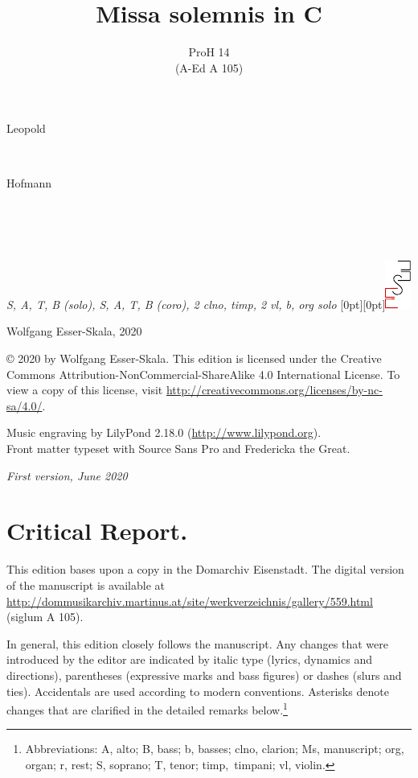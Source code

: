 \documentclass[parskip=full]{scrreprt}
\makeatletter
\DeclareRobustCommand{\sbseries}{\fontseries{sb}\selectfont}
\newcommand\fancytitlehead{
	\headingfont%
	\fontsize{80}{80}\selectfont\textcolor{black!80}{\@ifundefined{@shortname}{\@lastname}{\@shortname}.}\\[15pt]%
	\fontsize{60}{60}\selectfont\@ifundefined{@shorttitle}{\@title}{\@shorttitle}.%
}
\def\firstname#1{\def\@firstname{#1}}
\def\lastname#1{\def\@lastname{#1}}
\def\shorttitle#1{\def\@shorttitle{#1}}
\def\instrumentation#1{\def\@instrumentation{#1}}
\def\maketitle{%
\begin{titlepage}%
	\Large%
	{\@titlehead}%
	\vfill%
	{\strut\@firstname}\\%
	{\sbseries\color{oldred}\strut\@lastname}\\%
	{\strut\@namesuffix}%
	\vfill%
	{\sbseries\@title}\\%
	{\@subtitle}\\[\baselineskip]%
	{\itshape\@instrumentation}%
	\vfill%
	{\itshape\@parts}\hspace*{\fill}\raisebox{0pt}[0pt][0pt]{\includegraphics{ees_logo}}%
\end{titlepage}%
}
\newif\ifprintreport\printreportfalse
\makeatother
\begin{document}
\frenchspacing

\titlehead{\fancytitlehead}
\firstname{Leopold}
\lastname{Hofmann}
\title{Missa solemnis in C}
\shorttitle{Missa solemnis}
\subtitle{ProH 14\\(A-Ed A 105)}
\instrumentation{S, A, T, B (solo), S, A, T, B (coro), 2 clno, timp, 2 vl, b, org solo}
\maketitle


\thispagestyle{empty}

\vspace*{\fill}

\hspace*{1em}Wolfgang Esser-Skala, 2020

© 2020 by Wolfgang Esser-Skala. This edition is licensed under the Creative Commons Attribution-NonCommercial-ShareAlike 4.0 International License. To view a copy of this license, visit \url{http://creativecommons.org/licenses/by-nc-sa/4.0/}. 

Music engraving by LilyPond 2.18.0 (\url{http://www.lilypond.org}).\\
Front matter typeset with Source Sans Pro and Fredericka the Great.

\textit{First version, June 2020}

\vspace*{2cm}

\ifprintreport
\chapter*{Critical Report.}

This edition bases upon a copy in the Domarchiv Eisenstadt. The digital version of the manuscript is available at \url{http://dommusikarchiv.martinus.at/site/werkverzeichnis/gallery/559.html} (siglum A 105).

In general, this edition closely follows the manuscript. Any changes that were introduced by the editor are indicated by italic type (lyrics, dynamics and directions), parentheses (expressive marks and bass figures) or dashes (slurs and ties). Accidentals are used according to modern conventions. Asterisks denote changes that are clarified in the detailed remarks below.\footnote{Abbreviations: A, alto; B, bass; b, basses; clno, clarion; Ms, manuscript; org, organ; r, rest; S, soprano; T, tenor; timp,~timpani; vl, violin.}
\end{document}
